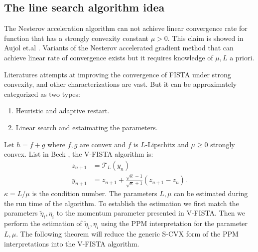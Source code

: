 \documentclass[12pt]{article}
\begin{document}
    \subsection{The line search algorithm idea}
        \par
        The Nesterov acceleration algorithm can not achieve linear convergence rate for function that has a strongly convexity constant $\mu > 0$. 
        This claim is showed in Aujol et.al \cite{aujol_optimal_2019}. 
        Variants of the Nesterov accelerated gradient method that can achieve linear rate of convergence exists but it requires knowledge of $\mu, L$ a priori. 
        \par
        Literatures attempts at improving the convergence of FISTA under strong convexity, and other characterizations are vast. 
        But it can be approximately categorized as two types: 
        \begin{enumerate}
            \item Heuristic and adaptive restart. 
            \item Linear search and estaimating the parameters. 
        \end{enumerate}
        \par
        Let $h = f + g$ where $f, g$ are convex and $f$ is $L$-Lipschitz and $\mu\ge 0$ strongly convex. 
        List in Beck \cite[(10.7.7)]{beck_first-order_nodate}, the V-FISTA algorithm is: 
        \begin{align*}
            z_{n + 1} &= \mathcal T_L(y_n)
            \\
            y_{n + 1} &= z_{n + 1} + \frac{\sqrt{\kappa} - 1}{\sqrt{\kappa} + 1}(z_{n + 1} - z_n). 
        \end{align*}
        $\kappa = L/\mu$ is the condition number. 
        The parameters $L, \mu$ can be estimated during the run time of the algorithm. 
        To establish the estimation we first match the parameters $\tilde \eta_i, \eta_i$ to the momentum parameter presented in V-FISTA. 
        Then we perform the estimation of $\tilde \eta_i, \eta_i$ using the PPM interpretation for the parameter $L, \mu$. 
        The following theorem will reduce the generic S-CVX form of the PPM interpretations into the V-FISTA algorithm. 
\end{document}
